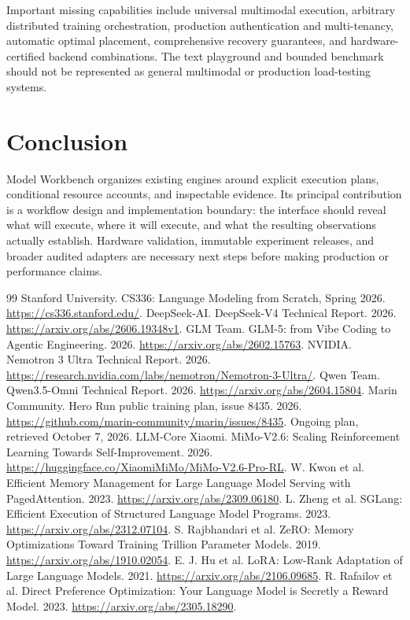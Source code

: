 \documentclass[10pt]{article}
\begin{document}
Important missing capabilities include universal multimodal execution, arbitrary distributed training orchestration, production authentication and multi-tenancy, automatic optimal placement, comprehensive recovery guarantees, and hardware-certified backend combinations. The text playground and bounded benchmark should not be represented as general multimodal or production load-testing systems.

\section{Conclusion}
Model Workbench organizes existing engines around explicit execution plans, conditional resource accounts, and inspectable evidence. Its principal contribution is a workflow design and implementation boundary: the interface should reveal what will execute, where it will execute, and what the resulting observations actually establish. Hardware validation, immutable experiment releases, and broader audited adapters are necessary next steps before making production or performance claims.

\begin{thebibliography}{99}
 Stanford University. CS336: Language Modeling from Scratch, Spring 2026. \url{https://cs336.stanford.edu/}.
 DeepSeek-AI. DeepSeek-V4 Technical Report. 2026. \url{https://arxiv.org/abs/2606.19348v1}.
 GLM Team. GLM-5: from Vibe Coding to Agentic Engineering. 2026. \url{https://arxiv.org/abs/2602.15763}.
 NVIDIA. Nemotron 3 Ultra Technical Report. 2026. \url{https://research.nvidia.com/labs/nemotron/Nemotron-3-Ultra/}.
 Qwen Team. Qwen3.5-Omni Technical Report. 2026. \url{https://arxiv.org/abs/2604.15804}.
 Marin Community. Hero Run public training plan, issue 8435. 2026. \url{https://github.com/marin-community/marin/issues/8435}. Ongoing plan, retrieved October 7, 2026.
 LLM-Core Xiaomi. MiMo-V2.6: Scaling Reinforcement Learning Towards Self-Improvement. 2026. \url{https://huggingface.co/XiaomiMiMo/MiMo-V2.6-Pro-RL}.
 W. Kwon et al. Efficient Memory Management for Large Language Model Serving with PagedAttention. 2023. \url{https://arxiv.org/abs/2309.06180}.
 L. Zheng et al. SGLang: Efficient Execution of Structured Language Model Programs. 2023. \url{https://arxiv.org/abs/2312.07104}.
 S. Rajbhandari et al. ZeRO: Memory Optimizations Toward Training Trillion Parameter Models. 2019. \url{https://arxiv.org/abs/1910.02054}.
 E. J. Hu et al. LoRA: Low-Rank Adaptation of Large Language Models. 2021. \url{https://arxiv.org/abs/2106.09685}.
 R. Rafailov et al. Direct Preference Optimization: Your Language Model is Secretly a Reward Model. 2023. \url{https://arxiv.org/abs/2305.18290}.
\end{thebibliography}
\end{document}
